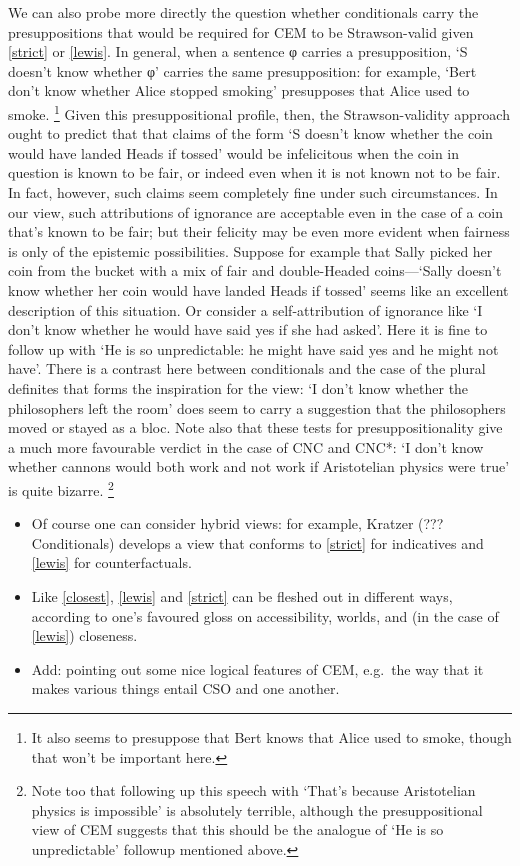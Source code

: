 \documentclass[If.tex]{subfiles}
\begin{document}
We can also probe more directly the question whether conditionals carry the presuppositions that would be required for CEM to be Strawson-valid given \ref{strict} or \ref{lewis}.  In general, when a sentence φ carries a presupposition, ‘S doesn't know whether φ’ carries the same presupposition: for example, ‘Bert don't know whether Alice stopped smoking’ presupposes that Alice used to smoke.%
\footnote{It also seems to presuppose that Bert knows that Alice used to smoke, though that won't be important here.}
Given this presuppositional profile, then, the Strawson-validity approach ought to predict that that claims of the form ‘S doesn't know whether the coin would have landed Heads if tossed’ would be infelicitous when the coin in question is known to be fair, or indeed even when it is not known not to be fair.  In fact, however, such claims seem completely fine under such circumstances.  In our view, such attributions of ignorance are acceptable even in the case of a coin that's known to be fair; but their felicity may be even more evident when fairness is only of the epistemic possibilities.   Suppose for example that Sally picked her coin from the bucket with a mix of fair and double-Headed coins---‘Sally doesn't know whether her coin would have landed Heads if tossed’ seems like an excellent description of this situation.  Or consider a self-attribution of ignorance like ‘I don't know whether he would have said yes if she had asked’.  Here it is fine to follow up with ‘He is so unpredictable: he might have said yes and he might not have’.  There is a contrast here between conditionals and the case of the plural definites that forms the inspiration for the view: ‘I don't know whether the philosophers left the room’ does seem to carry a suggestion that the philosophers moved or stayed as a bloc.  Note also that these tests for presuppositionality give a much more favourable verdict in the case of CNC and CNC*: ‘I don't know whether cannons would both work and not work if Aristotelian physics were true’ is quite bizarre.%
\footnote{Note too that following up this speech with ‘That's because Aristotelian physics is impossible’ is absolutely terrible, although the presuppositional view of CEM suggests that this should be the analogue of ‘He is so unpredictable’ followup mentioned above.}


\begin{itemize}
	\item
	Of course one can consider hybrid views: for example, Kratzer (???Conditionals) develops a view that conforms to \ref{strict} for indicatives and \ref{lewis} for counterfactuals.
	\item
	Like \ref{closest}, \ref{lewis} and \ref{strict} can be fleshed out in different ways,
	according to one's favoured gloss on accessibility, worlds, and (in
	the case of \ref{lewis}) closeness.
	\item
	Add: pointing out some nice logical features of CEM, e.g.~the way that
	it makes various things entail CSO and one another.
\end{itemize}
\end{document}
